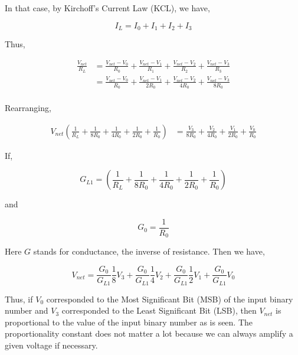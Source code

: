 In that case, by Kirchoff's Current Law (KCL), we have, 


\begin{equation*}
	I_{L} = I_{0} + I_{1} + I_{2} + I_{3}
\end{equation*}

Thus,

\begin{align*}
       \frac{V_{net}}{R_{L}} &= \frac{V_{net} - V_{0}}{R_{0}} + \frac{V_{net} - V_{1}}{R_{1}} + \frac{V_{net} - V_{2}}{R_{2}} + \frac{V_{net} - V_{3}}{R_{3}}\\
                             &= \frac{V_{net} - V_{0}}{R_{0}} + \frac{V_{net} - V_{1}}{2R_{0}} + \frac{V_{net} - V_{2}}{4R_{0}} + \frac{V_{net} - V_{3}}{8R_{0}}\\
\end{align*}

Rearranging,

\begin{align*}
	V_{net} (\frac{1}{R_{L}} + \frac{1}{8R_{0}} + \frac{1}{4R_{0}} + \frac{1}{2R_{0}} + \frac{1}{R_{0}}) &=
    \frac{V_{3}}{8R_{0}} + \frac{V_{2}}{4R_{0}} + \frac{V_{1}}{2R_{0}} + \frac{V_{0}}{R_{0}}
\end{align*}

If,

\begin{equation*}
	G_{L1} = (\frac{1}{R_{L}} + \frac{1}{8R_{0}} + \frac{1}{4R_{0}} + \frac{1}{2R_{0}} + \frac{1}{R_{0}})
\end{equation*}

and 

\begin{equation*}
	G_{0} = \frac{1}{R_{0}}
\end{equation*}

Here $G$ stands for conductance, the inverse of resistance. Then we have,

\begin{equation*}
	V_{net} = \frac{G_{0}}{G_{L1}}\frac{1}{8}V_{3} + \frac{G_{0}}{G_{L1}}\frac{1}{4}V_{2} + \frac{G_{0}}{G_{L1}}\frac{1}{2}V_{1} + \frac{G_{0}}{G_{L1}}V_{0}
\end{equation*}


Thus, if $V_{0}$ corresponded to the Most Significant Bit (MSB) of the input binary number and $V_{3}$ corresponded to the Least Significant Bit (LSB), then $V_{net}$ is proportional to the value of the input binary number as is seen. The proportionality constant does not matter a lot because we can always amplify a given voltage if necessary.



